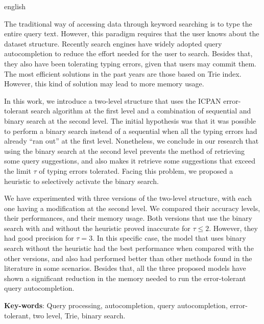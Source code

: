 \documentclass[
    article,
	12pt,				%
	openright,			%
	twoside,			%
	a4paper,			%
	english,			%
	spanish,			%
	brazil,				%
	]{abntex2}
\begin{document}
\begin{resumo}[Abstract]
 \begin{otherlanguage*}{english}

The traditional way of accessing data through keyword searching is to type the entire query text. However, this paradigm requires that the user knows about the dataset structure. Recently search engines have widely adopted query autocompletion to reduce the effort needed for the user to search. Besides that, they also have been tolerating typing errors, given that users may commit them. The most efficient solutions in the past years are those based on Trie index. However, this kind of solution may lead to more memory usage.

In this work, we introduce a two-level structure that uses the ICPAN error-tolerant search algorithm at the first level and a combination of sequential and binary search at the second level. The initial hypothesis was that it was possible to perform a binary search instead of a sequential when all the typing errors had already ``ran out'' at the first level. Nonetheless, we conclude in our research that using the binary search at the second level prevents the method of retrieving some query suggestions, and also makes it retrieve some suggestions that exceed the limit $\tau$ of typing errors tolerated. Facing this problem, we proposed a heuristic to selectively activate the binary search.

We have experimented with three versions of the two-level structure, with each one having a modification at the second level. We compared their accuracy levels, their performances, and their memory usage. Both versions that use the binary search with and without the heuristic proved inaccurate for $\tau \leq 2$. However, they had good precision for $\tau=3$. In this specific case, the model that uses binary search without the heuristic had the best performance when compared with the other versions, and also had performed better than other methods found in the literature in some scenarios. Besides that, all the three proposed models have shown a significant reduction in the memory needed to run the error-tolerant query autocompletion.


  \vspace{\onelineskip}
 
  \noindent 
  \textbf{Key-words}: Query processing, autocompletion, query autocompletion, error-tolerant, two level, Trie, binary search.
 \end{otherlanguage*}
\end{resumo}
\end{document}
